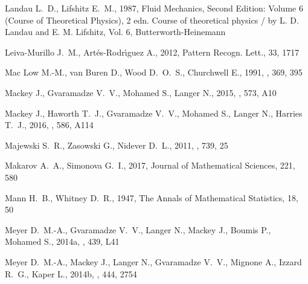 \documentclass[useAMS, usenatbib, a4paper]{mnras}
\begin{document}
\begin{thebibliography}{}
Landau L.~D.,  Lifshitz E.~M.,  1987, Fluid Mechanics, Second Edition: Volume 6
  (Course of Theoretical Physics), 2 edn.
Course of theoretical physics / by L. D. Landau and E. M. Lifshitz, Vol. 6,
  Butterworth-Heinemann

Leiva-Murillo J.~M.,  Art{\'e}s-Rodr\'{\i}guez A.,  2012, Pattern Recogn.
  Lett., 33, 1717

{Mac Low} M.-M.,  {van Buren} D.,  {Wood} D.~O.~S.,   {Churchwell} E.,  1991,
  \apj, 369, 395

{Mackey} J.,  {Gvaramadze} V.~V.,  {Mohamed} S.,   {Langer} N.,  2015, \aap,
  573, A10

{Mackey} J.,  {Haworth} T.~J.,  {Gvaramadze} V.~V.,  {Mohamed} S.,  {Langer}
  N.,   {Harries} T.~J.,  2016, \aap, 586, A114

{Majewski} S.~R.,  {Zasowski} G.,   {Nidever} D.~L.,  2011, \apj, 739, 25

Makarov A.~A.,  Simonova G.~I.,  2017, Journal of Mathematical Sciences, 221,
  580

Mann H.~B.,  Whitney D.~R.,  1947, The Annals of Mathematical Statistics, 18,
  50

{Meyer} D.~M.-A.,  {Gvaramadze} V.~V.,  {Langer} N.,  {Mackey} J.,  {Boumis}
  P.,   {Mohamed} S.,  2014a, \mnras, 439, L41

{Meyer} D.~M.-A.,  {Mackey} J.,  {Langer} N.,  {Gvaramadze} V.~V.,  {Mignone}
  A.,  {Izzard} R.~G.,   {Kaper} L.,  2014b, \mnras, 444, 2754


\end{thebibliography}
\end{document}
